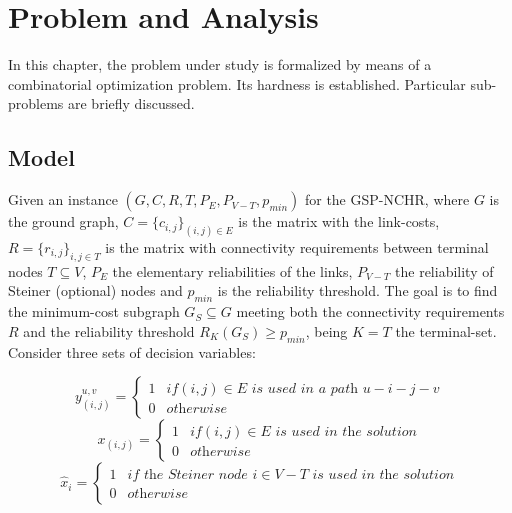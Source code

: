 \chapter{Problem and Analysis} \label{problem} 
In this chapter, the problem under study is formalized by means of a combinatorial optimization problem. Its hardness is established. Particular sub-problems are briefly discussed.  

\section{Model}
Given an instance $(G,C,R,T,P_E,P_{V-T},p_{min})$ for the GSP-NCHR, where $G$ is the ground graph, $C=\{c_{i,j}\}_{(i,j)\in E}$ 
is the matrix with the link-costs, $R=\{r_{i,j}\}_{i,j\in T}$ is the matrix with connectivity requirements between terminal nodes 
$T \subseteq V$, $P_E$ the elementary reliabilities of the links, $P_{V-T}$ the reliability of Steiner (optional) nodes and 
$p_{min}$ is the reliability threshold. The goal is to find the minimum-cost subgraph $G_S \subseteq G$ meeting both the connectivity 
requirements $R$ and the reliability threshold $R_K(G_S) \geq p_{min}$, being $K=T$ the terminal-set. 
Consider three sets of decision variables:


\[
    y_{(i,j)}^{u,v}=\left\{
                \begin{array}{ll}
1 & \textit{if} (i,j)\in E \, \, \textit{is used in a path} \, \, u-i-j-v\\
0 & \textit{otherwise}
                \end{array}
              \right.
  \]
\[
    x_{(i,j)}=\left\{
                \begin{array}{ll}
1 & \textit{if}  (i,j)\in E \, \, \textit{is used in the solution}\\
0 & \textit{otherwise} 
                \end{array}
              \right.
  \]
\[
    \hat{x}_{i}=\left\{
                \begin{array}{ll}
1 & \textit{if the Steiner node} \, \, i \in V-T \, \, \textit{is used in the solution}\\
0 & \textit{otherwise}
                \end{array}
              \right.
  \]

%

